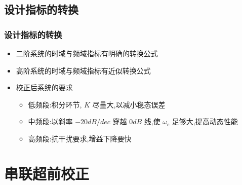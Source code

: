 \documentclass[table]{article}
\begin{document}
\subsection{设计指标的转换}
\label{sec-1-2}
\begin{frame}
\frametitle{设计指标的转换}
\label{sec-1-2-1}

\begin{itemize}
\item <2->二阶系统的时域与频域指标有明确的转换公式
\item <3->高阶系统的时域与频域指标有近似转换公式
\item <4->校正后系统的要求
\begin{itemize}
\item <4->低频段:积分环节, $K$ 尽量大,以减小稳态误差
\item <5->中频段:以斜率 $-20dB/dec$ 穿越 $0dB$ 线,使 $\omega_c$ 足够大,提高动态性能
\item <6->高频段:抗干扰要求,增益下降要快
\end{itemize}
\end{itemize}
\end{frame}
\section{串联超前校正}
\label{sec-2}
\end{document}

